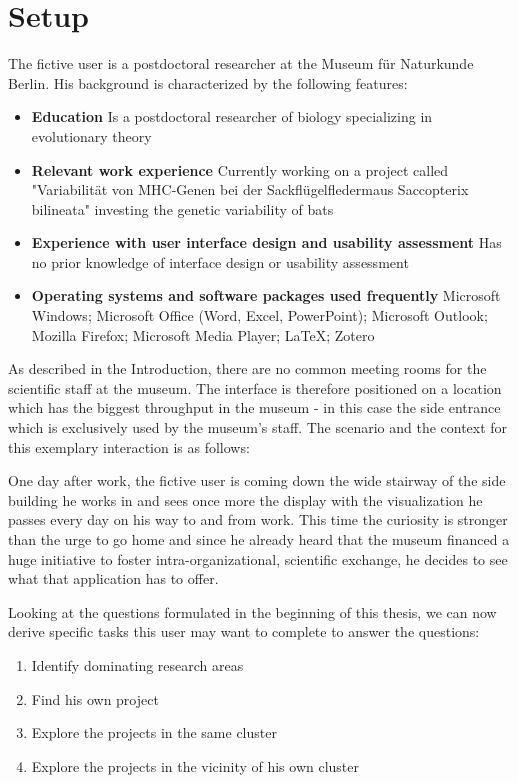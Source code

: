 \section{Setup}
The fictive user is a postdoctoral researcher at the Museum für Naturkunde Berlin. His background is characterized by the following features:
\begin{itemize}
	\item \textbf{Education}
	Is a postdoctoral researcher of biology specializing in evolutionary theory
	
	\item \textbf{Relevant work experience}
	Currently working on a project called "Variabilität von MHC-Genen bei der Sackflügelfledermaus Saccopterix bilineata" investing the genetic variability of bats
	
	\item \textbf{Experience with user interface design and usability assessment}
	Has no prior knowledge of interface design or usability assessment
	
	\item \textbf{Operating systems and software packages used frequently}
	Microsoft Windows; Microsoft Office (Word, Excel, PowerPoint); Microsoft Outlook; Mozilla Firefox; Microsoft Media Player; LaTeX; Zotero
\end{itemize}

As described in the Introduction, there are no common meeting rooms for the scientific staff at the museum. The interface is therefore positioned on a location which has the biggest throughput in the museum - in this case the side entrance which is exclusively used by the museum's staff.
The scenario and the context for this exemplary interaction is as follows:

	 One day after work, the fictive user is coming down the wide stairway of the side building he works in and sees once more the display with the visualization he passes every day on his way to and from work. This time the curiosity is stronger than the urge to go home and since he already heard that the museum financed a huge initiative to foster intra-organizational, scientific exchange, he decides to see what that application has to offer.


Looking at the questions formulated in the beginning of this thesis, we can now derive specific tasks this user may want to complete to answer the questions:
\begin{enumerate}
	\item Identify dominating research areas
	\item Find his own project
	\item Explore the projects in the same cluster
	\item Explore the projects in the vicinity of his own cluster
\end{enumerate}

